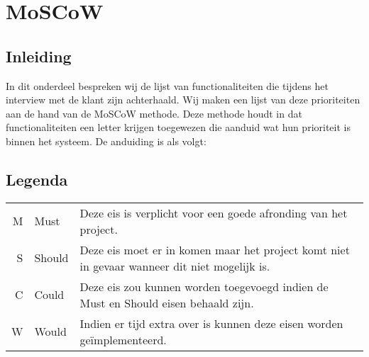 \chapter{MoSCoW}

\section{Inleiding}
In dit onderdeel bespreken wij de lijst van functionaliteiten die tijdens het interview met de klant zijn achterhaald.
Wij maken een lijst van deze prioriteiten aan de hand van de MoSCoW methode. Deze methode houdt in dat functionaliteiten een letter krijgen toegewezen die aanduid wat hun prioriteit is binnen het systeem.
De anduiding is als volgt: 

\section{Legenda}
\begin{tabular}{ r  l p{9cm} }
M & Must & Deze eis is verplicht voor een goede afronding van het project. \\
S & Should & Deze eis moet er in komen maar het project komt niet in gevaar wanneer dit niet mogelijk is. \\
C & Could & Deze eis zou kunnen worden toegevoegd indien de Must en Should eisen behaald zijn. \\
W & Would & Indien er tijd extra over is kunnen deze eisen worden geïmplementeerd. \\
\end{tabular}

